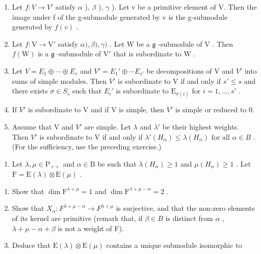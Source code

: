 \begin{enumerate}
\def\labelenumi{\alph{enumi})}
\item
  Let \(f: V \to V'\) satisfy \(\alpha\) ), \(\beta\) ), \(\gamma\) ). Let v be a primitive element of V. Then the image under f of the g-submodule generated by v is the g-submodule generated by \(f(v)\) .
\item
  Let \(f: \mathrm{V} \to \mathrm{V}'\) satisfy \(\alpha), \beta), \gamma)\) . Let \(\mathrm{W}\) be a \(\mathfrak{g}\) -submodule of \(\mathrm{V}\) . Then \(f(\mathrm{W})\) is a \(\mathfrak{g}\) -submodule of \(\mathrm{V}'\) that is subordinate to \(\mathrm{W}\) .
  \item
  Let \(V = E_{1} \oplus \cdots \oplus E_{s}\) and \(V' = E_{1}' \oplus \cdots E_{s'}\) be decompositions of V and \(V'\) into sums of simple modules. Then \(V'\) is subordinate to V if and only if \(s' \leq s\) and there exists \(\sigma \in S_{s}\) such that \(E_{i}'\) is subordinate to \(\mathrm{E}_{\sigma(i)}\) for \(i = 1, \ldots, s'\) .
\item
  If \(V'\) is subordinate to V and if V is simple, then \(V'\) is simple or reduced to 0.
\item
  Assume that V and \(V'\) are simple. Let \(\lambda\) and \(\lambda'\) be their highest weights. Then \(V'\) is subordinate to V if and only if \(\lambda'(H_{\alpha}) \leq \lambda(H_{\alpha})\) for all \(\alpha \in B\) . (For the sufficiency, use the preceding exercise.)
\end{enumerate}

\begin{enumerate}
\def\labelenumi{\arabic{enumi})}
\setcounter{enumi}{16}
\tightlist
\item
  Let \(\lambda, \mu \in \mathrm{P}_{++}\) and \(\alpha \in \mathrm{B}\) be such that \(\lambda(H_{\alpha}) \geq 1\) and \(\mu(H_{\alpha}) \geq 1\) . Let \(\mathrm{F} = \mathrm{E}(\lambda) \otimes \mathrm{E}(\mu)\) .
\end{enumerate}

\begin{enumerate}
\def\labelenumi{\alph{enumi})}
\item
  Show that \(\dim \mathrm{F}^{\lambda +\mu} = 1\) and \(\dim \mathrm{F}^{\lambda +\mu -\alpha} = 2\) .
\item
  Show that \(X_{\alpha}: F^{\lambda+\mu-\alpha} \to F^{\lambda+\mu}\) is surjective, and that the non-zero elements of its kernel are primitive (remark that, if \(\beta \in B\) is distinct from \(\alpha\) , \(\lambda + \mu - \alpha + \beta\) is not a weight of F).
\item
  Deduce that \(\mathrm{E}(\lambda)\otimes\mathrm{E}(\mu)\) contains a unique submodule isomorphic to
\end{enumerate}


